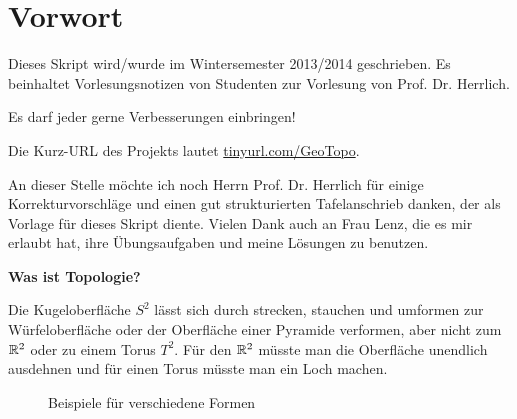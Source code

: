 \chapter*{Vorwort}
Dieses Skript wird/wurde im Wintersemester 2013/2014 geschrieben.
Es beinhaltet Vorlesungsnotizen von Studenten zur Vorlesung von
Prof. Dr. Herrlich.

Es darf jeder gerne Verbesserungen einbringen!

Die Kurz-URL des Projekts lautet \href{http://tinyurl.com/GeoTopo}{tinyurl.com/GeoTopo}.

An dieser Stelle möchte ich noch Herrn Prof. Dr. Herrlich 
für einige Korrekturvorschläge und einen gut strukturierten 
Tafelanschrieb danken, der als Vorlage für dieses Skript diente.
Vielen Dank auch an Frau Lenz, die es mir erlaubt hat, ihre 
Übungsaufgaben und meine Lösungen zu benutzen.


\textbf{Was ist Topologie?}

Die Kugeloberfläche $S^2$ lässt sich durch strecken, stauchen
und umformen zur Würfeloberfläche oder
der Oberfläche einer Pyramide verformen, aber nicht zum $\mdr^2$
oder zu einem Torus $T^2$. Für den $\mdr^2$ müsste man die Oberfläche
unendlich ausdehnen und für einen Torus müsste man ein Loch machen.

\begin{figure}[ht]
    \centering
    \subfigure[$S^2$]{
        
        \label{fig:s2}
    }%
    \subfigure[Würfel]{
        
        \label{fig:cube}
    }%
    \subfigure[Pyramide]{
        
        \label{fig:pyramide}
    }

    \subfigure[$\mdr^2$]{
        
        \label{fig:plane-r2}
    }%
    \label{Formen}
    \caption{Beispiele für verschiedene Formen}
\end{figure}
